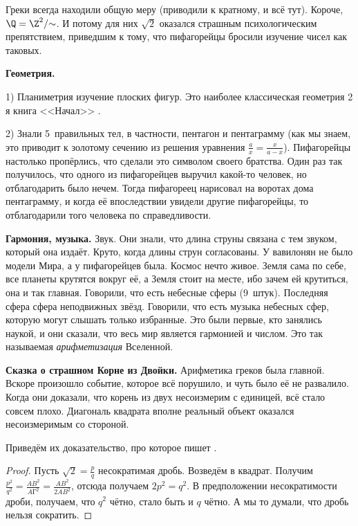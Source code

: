\documentclass[a4paper,oneside,fleqn,10pt]{article}
\begin{document}
Греки всегда находили общую меру (приводили к кратному, и всё тут).
Короче, $\Q = \Z^2/\mskip-5mu\sim$.  И потому для них $\sqrt2$
оказался страшным психологическим препятствием, приведшим к тому, что
пифагорейцы бросили изучение чисел как таковых.

\textbf{Геометрия.}

1) Планиметрия изучение плоских фигур.  Это наиболее классическая
геометрия 2 я книга <<Начал>> .

2) Знали 5~правильных тел, в частности, пентагон и пентаграмму (как мы
знаем, это приводит к золотому сечению из решения уравнения $\frac ax
= \frac x{a-x}$).  Пифагорейцы настолько пропёрлись, что сделали это
символом своего братства.  Один раз так получилось, что одного из
пифагорейцев выручил какой-то человек, но отблагодарить было
нечем. Тогда пифагореец нарисовал на воротах дома пентаграмму, и когда
её впоследствии увидели другие пифагорейцы, то отблагодарили того
человека по справедливости.

\textbf{Гармония, музыка.} Звук. Они знали, что длина струны связана с
тем звуком, который она издаёт.  Круто, когда длины струн
согласованы. У вавилонян не было модели Мира, а у пифагорейцев была.
Космос нечто живое. Земля сама по себе, все планеты крутятся вокруг
её, а Земля стоит на месте, ибо зачем ей крутиться, она и так
главная. Говорили, что есть небесные сферы (9~штук). Последняя сфера
сфера неподвижных звёзд.  Говорили, что есть музыка небесных сфер,
которую могут слышать только избранные.  Это были первые, кто занялись
наукой, и они сказали, что весь мир является гармонией и числом.  Это
так называемая \emph{арифметизация} Вселенной.

\textbf{Сказка о страшном Корне из Двойки.}  Арифметика греков была
главной. Вскоре произошло событие, которое всё порушило, и чуть было
её не развалило. Когда они доказали, что корень из двух несоизмерим с
единицей, всё стало совсем плохо.  Диагональ квадрата вполне реальный
объект оказался несоизмеримым со стороной.

Приведём их доказательство, про которое пишет .

\begin{proof}
Пусть $\sqrt2 = \frac{p}{q}$ несократимая дробь. Возведём в квадрат.
Получим $\frac{p^2}{q^2} = \frac{AB^2}{AГ^2} = \frac{AB^2}{2AB^2}$,
отсюда получаем $2p^2 = q^2$. В предположении несократимости дроби,
получаем, что $q^2$ чётно, стало быть и $q$ чётно. А мы то думали, что
дробь нельзя сократить.
\end{proof}
\end{document}

